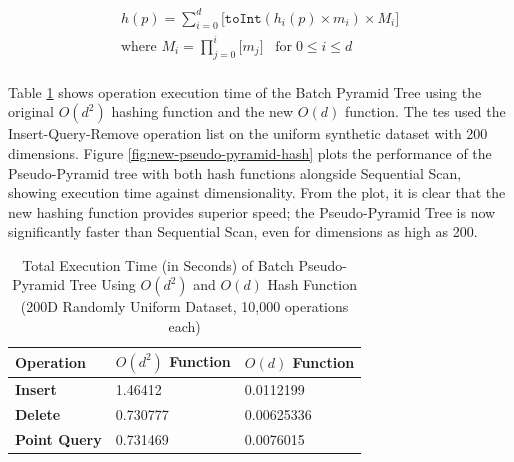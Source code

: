 \begin{multline}\\
	h(p) = \sum_{i = 0}^{d} { \lbrack \texttt{toInt}( h_i(p) \times m_i ) \times M_i \rbrack } \\
	\text{where } M_i = \prod_{j=0}^{i}{\lbrack m_j \rbrack} \;\;\; \text{for} \; 0 \leq i \leq d \\
	\label{eq:new-pseudo-pyramid-hash}
\end{multline}

Table \ref{tab:new-pseudo-pyramid-hash} shows operation execution time of the Batch Pyramid Tree using the original $O(d^2)$ hashing function and the new $O(d)$ function. The tes used the Insert-Query-Remove operation list on the uniform synthetic dataset with 200 dimensions. Figure \ref{fig:new-pseudo-pyramid-hash} plots the performance of the Pseudo-Pyramid tree with both hash functions alongside Sequential Scan, showing execution time against dimensionality. From the plot, it is clear that the new hashing function provides superior speed; the Pseudo-Pyramid Tree is now significantly faster than Sequential Scan, even for dimensions as high as 200.

\begin{table}
	\centering
	\begin{tabular}{|l|l|l|}
		\hline
		\textbf{Operation} & \textbf{$O(d^2)$ Function} & \textbf{$O(d)$ Function} \\
		\hline
		\textbf{Insert} & 1.46412 & 0.0112199 \\
		\textbf{Delete} & 0.730777 & 0.00625336 \\
		\textbf{Point Query} & 0.731469 & 0.0076015 \\
		\hline
	\end{tabular}
	\caption{Total Execution Time (in Seconds) of Batch Pseudo-Pyramid Tree Using $O(d^2)$ and $O(d)$ Hash Function (200D Randomly Uniform Dataset, 10,000 operations each)}
	\label{tab:new-pseudo-pyramid-hash}
\end{table}

